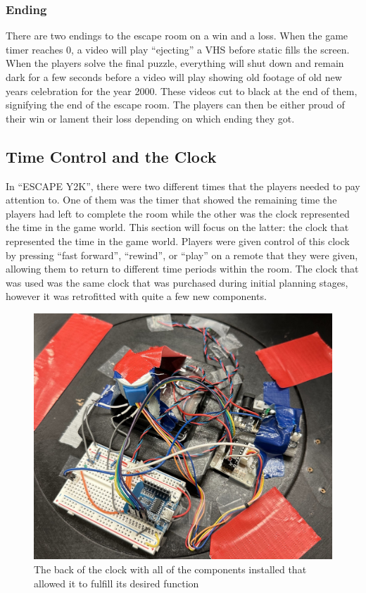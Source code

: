 \documentclass[conference]{IEEEtran}
\begin{document}
\subsubsection{Ending}

\indent There are two endings to the escape room on a win and a loss. When the game timer reaches 0, a video will play ``ejecting'' a VHS before static
fills the screen. When the players solve the final puzzle, everything will shut down and remain dark for a few seconds before a video will play showing old
footage of old new years celebration for the year 2000. These videos cut to black at the end of them, signifying the end of the escape room. The players can
then be either proud of their win or lament their loss depending on which ending they got. 

\subsection{Time Control and the Clock} %
In ``ESCAPE Y2K'', there were two different times that the players needed to pay attention to. One of them was the timer that showed the remaining time the players had left to complete the room
while the other was the clock represented the time in the game world. This section will focus on the latter: the clock that represented the time in the game world. Players were
given control of this clock by pressing ``fast forward'', ``rewind'', or ``play'' on a remote that they were given, allowing them to return to different time periods within
the room. The clock that was used was the same clock that was purchased during initial planning stages, however it was retrofitted with quite a few new components.
\\
\begin{figure}[ht]
    \centering
    \includegraphics[width=0.90\columnwidth]{Images/back_of_clock.jpg}
    \caption{The back of the clock with all of the components installed that allowed it to fulfill its desired function}
    \label{fig:backClock}
\end{figure}
\end{document}
